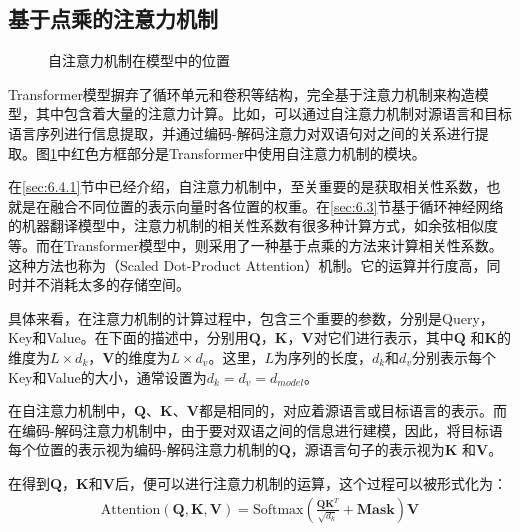 \subsection{基于点乘的注意力机制}

\begin{figure}[htp]
\centering

\caption{自注意力机制在模型中的位置}
\label{fig:6-44}
\end{figure}

\parinterval Transformer模型摒弃了循环单元和卷积等结构，完全基于注意力机制来构造模型，其中包含着大量的注意力计算。比如，可以通过自注意力机制对源语言和目标语言序列进行信息提取，并通过编码-解码注意力对双语句对之间的关系进行提取。图\ref{fig:6-44}中红色方框部分是Transformer中使用自注意力机制的模块。

\parinterval 在\ref{sec:6.4.1}节中已经介绍，自注意力机制中，至关重要的是获取相关性系数，也就是在融合不同位置的表示向量时各位置的权重。在\ref{sec:6.3}节基于循环神经网络的机器翻译模型中，注意力机制的相关性系数有很多种计算方式，如余弦相似度等。而在Transformer模型中，则采用了一种基于点乘的方法来计算相关性系数。这种方法也称为{\small{}}（Scaled Dot-Product Attention）机制。它的运算并行度高，同时并不消耗太多的存储空间。

\parinterval 具体来看，在注意力机制的计算过程中，包含三个重要的参数，分别是Query，\\Key和Value。在下面的描述中，分别用$\mathbf{Q}$，$\mathbf{K}$，$\mathbf{V}$对它们进行表示，其中$\mathbf{Q}$ 和$\mathbf{K}$的维度为$L\times d_k$，$\mathbf{V}$的维度为$L\times d_v$。这里，$L$为序列的长度，$d_k$和$d_v$分别表示每个Key和Value的大小，通常设置为$d_k=d_v=d_{model}$。

\parinterval 在自注意力机制中，$\mathbf{Q}$、$\mathbf{K}$、$\mathbf{V}$都是相同的，对应着源语言或目标语言的表示。而在编码-解码注意力机制中，由于要对双语之间的信息进行建模，因此，将目标语每个位置的表示视为编码-解码注意力机制的$\mathbf{Q}$，源语言句子的表示视为$\mathbf{K}$ 和$\mathbf{V}$。

\parinterval 在得到$\mathbf{Q}$，$\mathbf{K}$和$\mathbf{V}$后，便可以进行注意力机制的运算，这个过程可以被形式化为：
\begin{eqnarray}
\textrm{Attention}(\mathbf{Q},\mathbf{K},\mathbf{V}) = \textrm{Softmax}
 ( \frac{\mathbf{Q}\mathbf{K}^{T}} {\sqrt{d_k}} + \mathbf{Mask} ) \mathbf{V}
\label{eq:6-47}
\end{eqnarray}

